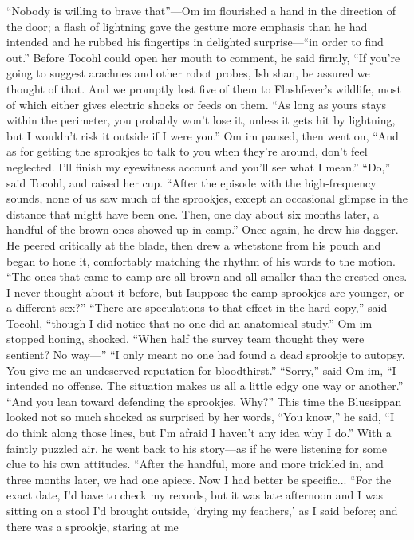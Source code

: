 \documentclass[9pt]{article}
\begin{document}
“Nobody is willing to brave that”—Om im flourished a hand in the direction of the door; a flash of
lightning gave the gesture more emphasis than he had intended and he rubbed his fingertips in delighted
surprise—“in order to find out.”
Before Tocohl could open her mouth to comment, he said firmly, “If you’re going to suggest arachnes
and other robot probes, Ish shan, be assured we thought of that. And we promptly lost five of them to
Flashfever’s wildlife, most of which either gives electric shocks or feeds on them.
“As long as yours stays within the perimeter, you probably won’t lose it, unless it gets hit by lightning,
but I wouldn’t risk it outside if I were you.” Om im paused, then went on, “And as for getting the
sprookjes to talk to you when they’re around, don’t feel neglected. I’ll finish my eyewitness account and
you’ll see what I mean.”
“Do,” said Tocohl, and raised her cup.
“After the episode with the high-frequency sounds, none of us saw much of the sprookjes, except an
occasional glimpse in the distance that might have been one. Then, one day about six months later, a
handful of the brown ones showed up in camp.”
Once again, he drew his dagger. He peered critically at the blade, then drew a whetstone from his
pouch and began to hone it, comfortably matching the rhythm of his words to the motion. “The ones that
came to camp are all brown and all smaller than the crested ones. I never thought about it before, but Isuppose the camp sprookjes are younger, or a different sex?”
“There are speculations to that effect in the hard-copy,” said Tocohl, “though I did notice that no one
did an anatomical study.”
Om im stopped honing, shocked. “When half the survey team thought they were sentient? No
way—”
“I only meant no one had found a dead sprookje to autopsy. You give me an undeserved reputation
for bloodthirst.”
“Sorry,” said Om im, “I intended no offense. The situation makes us all a little edgy one way or
another.”
“And you lean toward defending the sprookjes. Why?”
This time the Bluesippan looked not so much shocked as surprised by her words, “You know,” he
said, “I do think along those lines, but I’m afraid I haven’t any idea why I do.”
With a faintly puzzled air, he went back to his story—as if he were listening for some clue to his own
attitudes. “After the handful, more and more trickled in, and three months later, we had one apiece. Now
I had better be specific...
“For the exact date, I’d have to check my records, but it was late afternoon and I was sitting on a
stool I’d brought outside, ‘drying my feathers,’ as I said before; and there was a sprookje, staring at me
\end{document}
